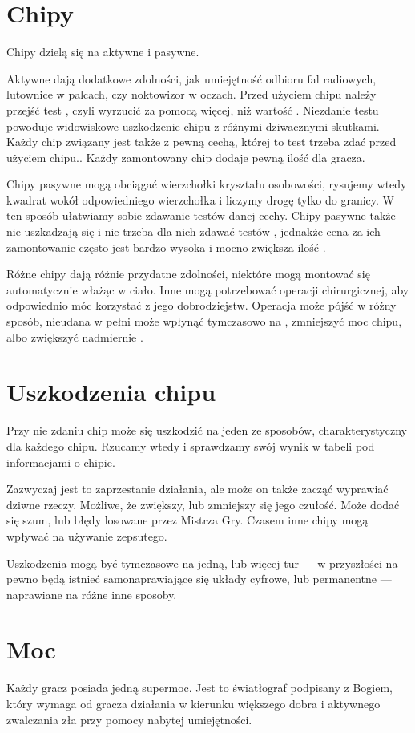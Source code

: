 \section{Chipy}
Chipy dzielą się na aktywne i pasywne.

Aktywne dają dodatkowe zdolności, jak umiejętność odbioru fal radiowych, lutownice w palcach, czy noktowizor w oczach.
Przed użyciem chipu należy przejść test \abnkp, czyli wyrzucić za pomocą \dxx więcej, niż wartość \abnkp. 
Niezdanie testu \abnkp powoduje widowiskowe uszkodzenie chipu z różnymi dziwacznymi skutkami.
Każdy chip związany jest także z pewną cechą, której to test trzeba zdać przed użyciem chipu..
Każdy zamontowany chip dodaje pewną ilość \abnkp dla gracza.

Chipy pasywne mogą obciągać wierzchołki kryształu osobowości, rysujemy wtedy kwadrat wokół odpowiedniego wierzchołka i liczymy drogę tylko do granicy.
W ten sposób ułatwiamy sobie zdawanie testów danej cechy.
Chipy pasywne także nie uszkadzają się i nie trzeba dla nich zdawać testów \abnkp, jednakże cena za ich zamontowanie często jest bardzo wysoka i mocno zwiększa ilość \abnkp.

Różne chipy dają różnie przydatne zdolności, niektóre mogą montować się automatycznie włażąc w ciało.
Inne mogą potrzebować operacji chirurgicznej, aby odpowiednio móc korzystać z jego dobrodziejstw.
Operacja może pójść w różny sposób, nieudana w pełni może wpłynąć tymczasowo na \abzyc, zmniejszyć moc chipu, albo zwiększyć nadmiernie \abnkp.

\section{Uszkodzenia chipu}
Przy nie zdaniu \abnkp chip może się uszkodzić na jeden ze sposobów, charakterystyczny dla każdego chipu.
Rzucamy wtedy \dxx i sprawdzamy swój wynik w tabeli pod informacjami o chipie.

Zazwyczaj jest to zaprzestanie działania, ale może on także zacząć wyprawiać dziwne rzeczy.
Możliwe, że zwiększy, lub zmniejszy się jego czułość.
Może dodać się szum, lub błędy losowane przez Mistrza Gry.
Czasem inne chipy mogą wpływać na używanie zepsutego.

Uszkodzenia mogą być tymczasowe na jedną, lub więcej tur --- w przyszłości na pewno będą istnieć samonaprawiające się układy cyfrowe, lub permanentne --- naprawiane na różne inne sposoby.

\section{Moc}
Każdy gracz posiada jedną supermoc.
Jest to światłograf podpisany z Bogiem, który wymaga od gracza działania w kierunku większego dobra i aktywnego zwalczania zła przy pomocy nabytej umiejętności.

